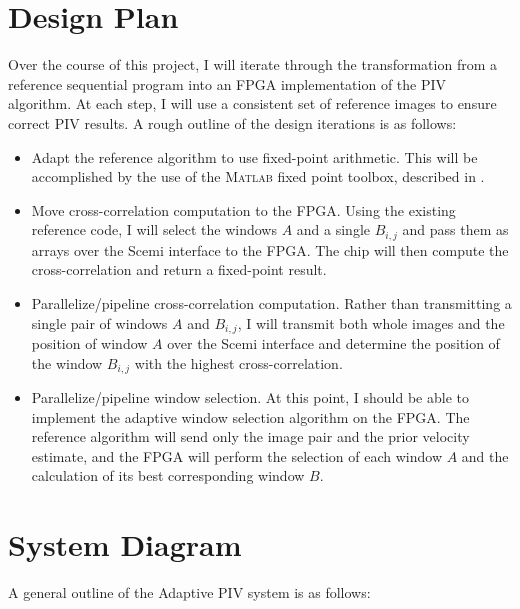 \documentclass{article}
\begin{document}
	\section{Design Plan} %
	Over the course of this project, I will iterate through the transformation from a reference sequential program into an FPGA implementation of the PIV algorithm. At each step, I will use a consistent set of reference images to ensure correct PIV results. A rough outline of the design iterations is as follows:
	\begin{itemize}
	\item Adapt the reference algorithm to use fixed-point arithmetic. This will be accomplished by the use of the \textsc{Matlab} fixed point toolbox, described in \citep{MatlabFP}.
	\item Move cross-correlation computation to the FPGA. Using the existing reference code, I will select the windows $A$ and a single $B_{i, j}$ and pass them as arrays over the Scemi interface to the FPGA. The chip will then compute the cross-correlation and return a fixed-point result. 
	\item Parallelize/pipeline cross-correlation computation. Rather than transmitting a single pair of windows $A$ and $B_{i, j}$, I will transmit both whole images and the position of window $A$ over the Scemi interface and determine the position of the window $B_{i, j}$ with the highest cross-correlation.
	\item Parallelize/pipeline window selection. At this point, I should be able to implement the adaptive window selection algorithm on the FPGA. The reference algorithm will send only the image pair and the prior velocity estimate, and the FPGA will perform the selection of each window $A$ and the calculation of its best corresponding window $B$. 
	\end{itemize}

	\section{System Diagram}
	\label{sec:system_diagrams}

	A general outline of the Adaptive PIV system is as follows:
\end{document}
